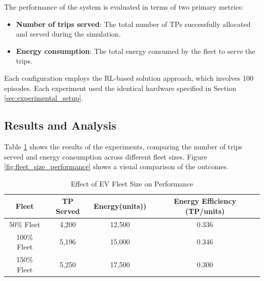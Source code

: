 The performance of the system is evaluated in terms of two primary metrics:
\begin{itemize}
    \item \textbf{Number of trips served}: The total number of TPs successfully allocated and served during the simulation.
    \item \textbf{Energy consumption}: The total energy consumed by the fleet to serve the trips.
\end{itemize}

Each configuration employs the RL-based solution approach, which involves 100 episodes. Each experiment used the identical hardware specified in Section \ref{sec:experimental_setup}.


\subsection{Results and Analysis}
Table \ref{tab:fleet_size_results} shows the results of the experiments, comparing the number of trips served and energy consumption across different fleet sizes. Figure \ref{fig:fleet_size_performance} shows a visual comparison of the outcomes.


\begin{table}[htbp]
    \centering
    \caption{Effect of EV Fleet Size on Performance}
    \label{tab:fleet_size_results}
    \begin{tabular}{|c|c|c|c|}
        \hline
        \textbf{Fleet} & \textbf{TP Served} & \textbf{Energy(units))} & \textbf{Energy Efficiency (TP/units)} \\
        \hline
        50\% Fleet  & 4,200 & 12,500 & 0.336 \\
        100\% Fleet  & 5,196 & 15,000 & 0.346 \\
        150\% Fleet & 5,250 & 17,500 & 0.300 \\
        \hline
    \end{tabular}
\end{table}

